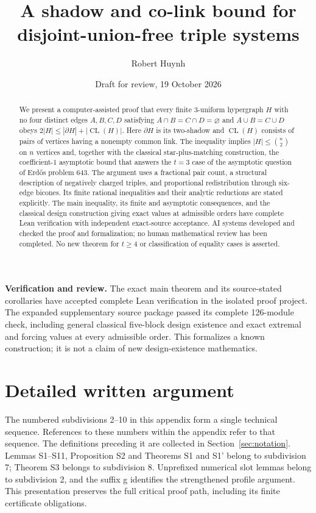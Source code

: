\documentclass[11pt]{article}
\title{A shadow and co-link bound for disjoint-union-free triple systems}
\author{Robert Huynh}
\date{Draft for review, 19 October 2026}
\newcommand{\CL}{\operatorname{CL}}
\newcommand{\pending}[1]{\par\noindent\textcolor{blue!45!black}{\textbf{Verification and review.} #1}\par}
\begin{document}
\maketitle
\begin{abstract}
We present a computer-assisted proof that every finite $3$-uniform hypergraph $H$ with no four distinct edges $A,B,C,D$ satisfying $A\cap B=C\cap D=\varnothing$ and $A\cup B=C\cup D$ obeys
$2|H|\leq |\partial H|+|\CL(H)|$. Here $\partial H$ is its two-shadow and $\CL(H)$ consists of pairs of vertices having a nonempty common link. The inequality implies $|H|\leq\binom n2$ on $n$ vertices and, together with the classical star-plus-matching construction, the coefficient-$1$ asymptotic bound that answers the $t=3$ case of the asymptotic question of Erd\H{o}s problem 643. The argument uses a fractional pair count, a structural description of negatively charged triples, and proportional redistribution through six-edge bicones. Its finite rational inequalities and their analytic reductions are stated explicitly. The main inequality, its finite and asymptotic consequences, and the classical design construction giving exact values at admissible orders have complete Lean verification with independent exact-source acceptance. AI systems developed and checked the proof and formalization; no human mathematical review has been completed. No new theorem for $t\geq4$ or classification of equality cases is asserted.
\end{abstract}
\pending{The exact main theorem and its source-stated corollaries have accepted complete Lean verification in the isolated proof project. The expanded supplementary source package passed its complete 126-module check, including general classical five-block design existence and exact extremal and forcing values at every admissible order. This formalizes a known construction; it is not a claim of new design-existence mathematics.}
\tableofcontents


\appendix
\section{Detailed written argument}
The numbered subdivisions 2--10 in this appendix form a single technical sequence. References to these numbers within the appendix refer to that sequence. The definitions preceding it are collected in Section~\ref{sec:notation}. Lemmas S1--S11, Proposition S2 and Theorems S1 and S1' belong to subdivision 7; Theorem S3 belongs to subdivision 8. Unprefixed numerical slot lemmas belong to subdivision 2, and the suffix g identifies the strengthened profile argument. This presentation preserves the full critical proof path, including its finite certificate obligations.






\end{document}
